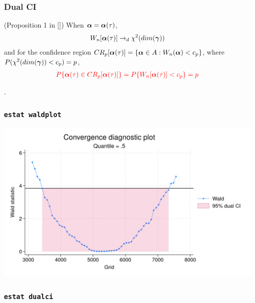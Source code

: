 \documentclass[11pt]{beamer}
\begin{document}
\begin{frame}
  \frametitle{Dual CI}
  \begin{prop}(Proposition 1 in
    \citeauthor{chernozhukov2008}[\citeyear{chernozhukov2008}])
When $\boldsymbol{\alpha} =  \boldsymbol{\alpha}(\tau)$,
\begin{align*}
  W_n[\boldsymbol{\alpha}(\tau)] \rightarrow_d \chi^2(dim(\boldsymbol{\gamma}))
\end{align*}
and for the confidence region $CR_p[\boldsymbol{\alpha}(\tau)] = \{\boldsymbol{\alpha} \in A:
W_n(\boldsymbol{\alpha}) < c_p\}$, where $P(\chi^2(dim(\boldsymbol{\gamma})) < c_p) = p$,
\begin{align}
 {\color{red}{ P\{\boldsymbol{\alpha}(\tau) \in CR_p[\boldsymbol{\alpha}(\tau)]\} = P\{ W_n[\boldsymbol{\alpha}(\tau)] <
 c_p\} = p}}
\end{align}
\end{prop}

\vskip 1cm
.
\end{frame}

\begin{frame}
  \frametitle{ {\tt estat waldplot}}
  \begin{center} 
\includegraphics[scale=0.22]{eps/waldplot}
\end{center}
\end{frame}

\begin{frame}
  \frametitle{ {\tt estat dualci}}
\end{frame}
\end{document}
